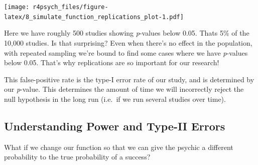 \documentclass[
]{book}
\newenvironment{Shaded}{\begin{snugshade}}{\end{snugshade}}
\newcommand{\AttributeTok}[1]{\textcolor[rgb]{0.77,0.63,0.00}{#1}}
\newcommand{\CommentTok}[1]{\textcolor[rgb]{0.56,0.35,0.01}{\textit{#1}}}
\newcommand{\ControlFlowTok}[1]{\textcolor[rgb]{0.13,0.29,0.53}{\textbf{#1}}}
\newcommand{\DecValTok}[1]{\textcolor[rgb]{0.00,0.00,0.81}{#1}}
\newcommand{\FunctionTok}[1]{\textcolor[rgb]{0.00,0.00,0.00}{#1}}
\newcommand{\NormalTok}[1]{#1}
\newcommand{\OtherTok}[1]{\textcolor[rgb]{0.56,0.35,0.01}{#1}}
\newcommand{\SpecialCharTok}[1]{\textcolor[rgb]{0.00,0.00,0.00}{#1}}
\begin{document}
\texttt{[image: r4psych\_files/figure-latex/8\_simulate\_function\_replications\_plot-1.pdf]}

Here we have roughly 500 studies showing \emph{p}-values below 0.05. Thats 5\% of the 10,000 studies. Is that surprising? Even when there's no effect in the population, with repeated sampling we're bound to find some cases where we have \emph{p}-values below 0.05. That's why replications are so important for our research!

This false-positive rate is the type-I error rate of our study, and is determined by our \emph{p}-value. This determines the amount of time we will incorrectly reject the null hypothesis in the long run (i.e.~if we run several studies over time).

\hypertarget{understanding-power-and-type-ii-errors}{%
\subsection{Understanding Power and Type-II Errors}\label{understanding-power-and-type-ii-errors}}

What if we change our function so that we can give the psychic a different probability to the true probability of a success?

\begin{Shaded}
\end{Shaded}
\end{document}
